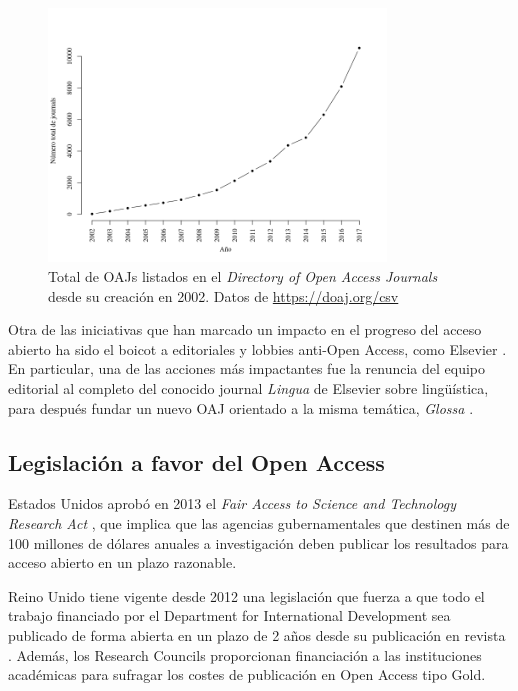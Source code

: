\begin{figure}[htbp]
  \centering
  \includegraphics[width=0.8\textwidth]{doaj_years.png}
  \caption{\label{fig:doaj}Total de OAJs listados en el \textit{Directory of Open Access Journals} desde su creación en 2002. Datos de \url{https://doaj.org/csv}}
  
\end{figure}

Otra de las iniciativas que han marcado un impacto en el progreso del acceso abierto ha sido el boicot a editoriales y lobbies anti-Open Access, como Elsevier \cite{costknowledge}. En particular, una de las acciones más impactantes fue la renuncia del equipo editorial al completo del conocido journal \textit{Lingua} de Elsevier sobre lingüística, para después fundar un nuevo OAJ orientado a la misma temática, \textit{Glossa} \cite{linguaglossa}.


\subsection{Legislación a favor del Open Access}


Estados Unidos aprobó en 2013 el \textit{Fair Access to Science and Technology Research Act} \cite{fastr}, que implica que las agencias gubernamentales que destinen más de 100 millones de dólares anuales a investigación deben publicar los resultados para acceso abierto en un plazo razonable. %

Reino Unido tiene vigente desde 2012 una legislación que fuerza a que todo el trabajo financiado por el Department for International Development sea publicado de forma abierta en un plazo de 2 años desde su publicación en revista \cite{ukdifd}. Además, los Research Councils proporcionan financiación a las instituciones académicas para sufragar los costes de publicación en Open Access tipo Gold\cite{rcuk}.

